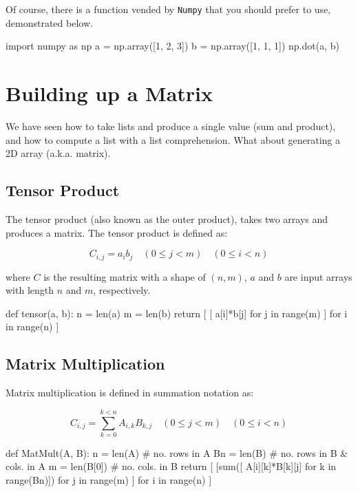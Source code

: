 \documentclass{../../KDHnotes}
\begin{document}
Of course, there is a function vended by \texttt{Numpy} that you should prefer to use, demonstrated below.

\begin{python}
import numpy as np
a = np.array([1, 2, 3])
b = np.array([1, 1, 1])
np.dot(a, b)
\end{python}



\section{Building up a Matrix}

We have seen how to take lists and produce a single value (sum and product), and how to compute a list with a list comprehension. What about generating a 2D array (a.k.a. matrix).

\subsection{Tensor Product}
The tensor product (also known as the outer product), takes two arrays and produces a matrix. The tensor product is defined as:

\begin{equation}
	C_{i, j} = a_i b_j \quad (0 \leq j < m) \quad (0 \leq i < n)
\end{equation}

where $C$ is the resulting matrix with a shape of $(n, m)$, $a$ and $b$ are input arrays with length $n$ and $m$, respectively.

\begin{python}
def tensor(a, b):
  n = len(a)
  m = len(b)
  return [
      [ a[i]*b[j] for j in range(m) ]
            for i in range(n)
  ]
\end{python}


\subsection{Matrix Multiplication}
Matrix multiplication is defined in summation notation as:

\begin{equation}
	C_{i,j} = \sum_{k=0}^{k<n} A_{i,k} B_{k,j}
	\quad
	(0 \leq j < m)
	\quad
	(0 \leq i < n)
\end{equation}


\begin{python}
def MatMult(A, B):
  n = len(A)    # no. rows in A
  Bn = len(B)    # no. rows in B & cols. in A
  m = len(B[0]) # no. cols. in B
  return [
  [sum([ A[i][k]*B[k][j] for k in range(Bn)])
            for j in range(m) ]
        for i in range(n) ]
\end{python}
\end{document}
